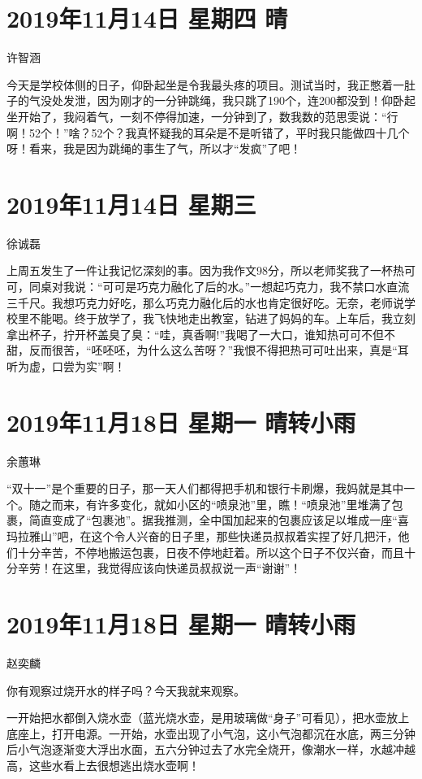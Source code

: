 \section{2019年11月14日 星期四 晴}

许智涵

今天是学校体侧的日子，仰卧起坐是令我最头疼的项目。测试当时，我正憋着一肚子的气没处发泄，因为刚才的一分钟跳绳，我只跳了190个，连200都没到！仰卧起坐开始了，我闷着气，一刻不停得加速，一分钟到了，数我数的范思雯说：``行啊！52个！''啥？52个？我真怀疑我的耳朵是不是听错了，平时我只能做四十几个呀！看来，我是因为跳绳的事生了气，所以才``发疯''了吧！

\section{2019年11月14日 星期三}

徐诚磊

上周五发生了一件让我记忆深刻的事。因为我作文98分，所以老师奖我了一杯热可可，同桌对我说：``可可是巧克力融化了后的水。''一想起巧克力，我不禁口水直流三千尺。我想巧克力好吃，那么巧克力融化后的水也肯定很好吃。无奈，老师说学校里不能喝。终于放学了，我飞快地走出教室，钻进了妈妈的车。上车后，我立刻拿出杯子，拧开杯盖臭了臭：``哇，真香啊!''我喝了一大口，谁知热可可不但不甜，反而很苦，``呸呸呸，为什么这么苦呀？''我恨不得把热可可吐出来，真是``耳听为虚，口尝为实''啊！

\section{2019年11月18日 星期一 晴转小雨}

余蕙琳

``双十一''是个重要的日子，那一天人们都得把手机和银行卡刷爆，我妈就是其中一个。随之而来，有许多变化，就如小区的``喷泉池''里，瞧！``喷泉池''里堆满了包裹，简直变成了``包裹池''。据我推测，全中国加起来的包裹应该足以堆成一座``喜玛拉雅山''吧，在这个令人兴奋的日子里，那些快递员叔叔着实捏了好几把汗，他们十分辛苦，不停地搬运包裹，日夜不停地赶着。所以这个日子不仅兴奋，而且十分辛劳！在这里，我觉得应该向快递员叔叔说一声``谢谢''！

\section{2019年11月18日 星期一 晴转小雨}

赵奕麟

你有观察过烧开水的样子吗？今天我就来观察。

一开始把水都倒入烧水壶（蓝光烧水壶，是用玻璃做``身子''可看见），把水壶放上底座上，打开电源。一开始，水壶出现了小气泡，这小气泡都沉在水底，两三分钟后小气泡逐渐变大浮出水面，五六分钟过去了水完全烧开，像潮水一样，水越冲越高，这些水看上去很想逃出烧水壶啊！

